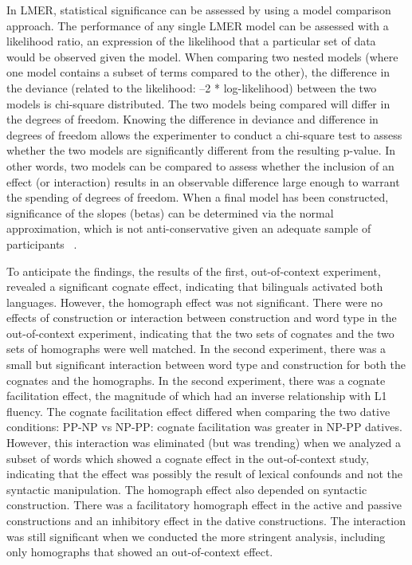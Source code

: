 In LMER, statistical significance can be assessed by using a model comparison approach. The performance of any single LMER model can be assessed with a likelihood ratio, an expression of the likelihood that a particular set of data would be observed given the model. When comparing two nested models (where one model contains a subset of terms compared to the other), the difference in the deviance (related to the likelihood: --2 * log-likelihood) between the two models is chi-square distributed. The two models being compared will differ in the degrees of freedom. Knowing the difference in deviance and difference in degrees of freedom allows the experimenter to conduct a chi-square test to assess whether the two models are significantly different from the resulting p-value. In other words, two models can be compared to assess whether the inclusion of an effect (or interaction) results in an observable difference large enough to warrant the spending of degrees of freedom. When a final model has been constructed, significance of the slopes (betas) can be determined via the normal approximation, which is not anti-conservative given an adequate sample of participants ~\citep{Barr2013}. 

To anticipate the findings, the results of the first, out-of-context experiment, revealed a significant cognate effect, indicating that bilinguals activated both languages. However, the homograph effect was not significant. There were no effects of construction or interaction between construction and word type in the out-of-context experiment, indicating that the two sets of cognates and the two sets of homographs were well matched. In the second experiment, there was a small but significant interaction between word type and construction for both the cognates and the homographs. In the second experiment, there was a cognate facilitation effect, the magnitude of which had an inverse relationship with L1 fluency. The cognate facilitation effect differed when comparing the two dative conditions: PP-NP vs NP-PP: cognate facilitation was greater in NP-PP datives. However, this interaction was eliminated (but was trending) when we analyzed a subset of words which showed a cognate effect in the out-of-context study, indicating that the effect was possibly the result of lexical confounds and not the syntactic manipulation. The homograph effect also depended on syntactic construction. There was a facilitatory homograph effect in the active and passive constructions and an inhibitory effect in the dative constructions. The interaction was still significant when we conducted the more stringent analysis, including only homographs that showed an out-of-context effect. 

